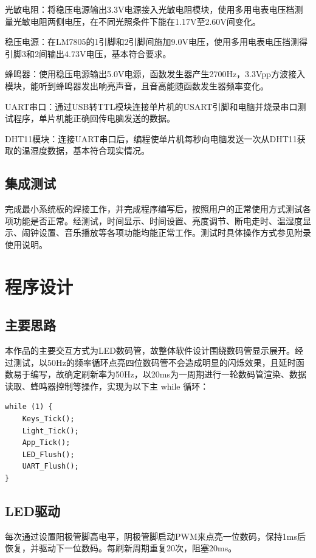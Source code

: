 \documentclass[a4paper,11pt,UTF8]{ctexart}
\begin{document}
光敏电阻：将稳压电源输出3.3V电源接入光敏电阻模块，使用多用电表电压档测量光敏电阻两侧电压，在不同光照条件下能在1.17V至2.60V间变化。

稳压电源：在LM7805的1引脚和2引脚间施加9.0V电压，使用多用电表电压挡测得引脚3和2间输出4.73V电压，基本符合要求。

蜂鸣器：使用稳压电源输出5.0V电源，函数发生器产生2700Hz，3.3Vpp方波接入模块，能听到蜂鸣器发出响亮声音，且音高能随函数发生器频率变化。

UART串口：通过USB转TTL模块连接单片机的USART引脚和电脑并烧录串口测试程序，单片机能正确回传电脑发送的数据。

DHT11模块：连接UART串口后，编程使单片机每秒向电脑发送一次从DHT11获取的温湿度数据，基本符合现实情况。

\subsection{集成测试}

完成最小系统板的焊接工作，并完成程序编写后，按照用户的正常使用方式测试各项功能是否正常。经测试，时间显示、时间设置、亮度调节、断电走时、温湿度显示、闹钟设置、音乐播放等各项功能均能正常工作。测试时具体操作方式参见附录使用说明。

\section{程序设计}

\subsection{主要思路}

本作品的主要交互方式为LED数码管，故整体软件设计围绕数码管显示展开。经过测试，以50Hz的频率循环点亮四位数码管不会造成明显的闪烁效果，且延时函数易于编写，故确定刷新率为50Hz，以20ms为一周期进行一轮数码管渲染、数据读取、蜂鸣器控制等操作，实现为以下主 while 循环：

\begin{lstlisting}[caption={主while循环},captionpos=b]
while (1) {
    Keys_Tick();
    Light_Tick();
    App_Tick();
    LED_Flush();
    UART_Flush();
}
\end{lstlisting}

\subsection{LED驱动}

每次通过设置阳极管脚高电平，阴极管脚启动PWM来点亮一位数码，保持1ms后恢复，并驱动下一位数码。每刷新周期重复20次，阻塞20ms。
\end{document}
